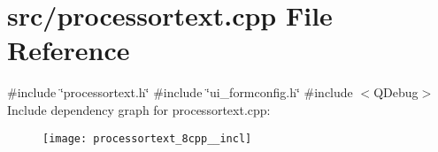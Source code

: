 \section{src/processortext.cpp File Reference}
\label{processortext_8cpp}
{\ttfamily \#include \char`\"{}processortext.\+h\char`\"{}}\newline
{\ttfamily \#include \char`\"{}ui\+\_\+formconfig.\+h\char`\"{}}\newline
{\ttfamily \#include $<$Q\+Debug$>$}\newline
Include dependency graph for processortext.\+cpp\+:\nopagebreak
\begin{figure}[H]
\begin{center}
\leavevmode
\texttt{[image: processortext\_8cpp\_\_incl]}
\end{center}
\end{figure}
